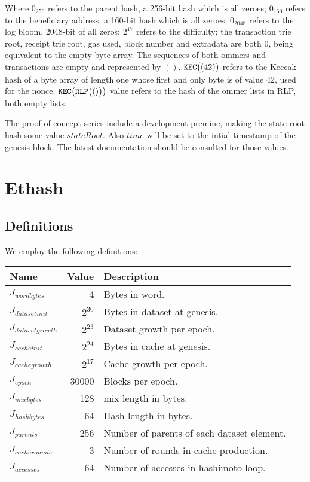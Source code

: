 \documentclass[9pt,oneside]{amsart}
\begin{document}
Where $0_{256}$ refers to the parent hash, a 256-bit hash which is all zeroes; $0_{160}$ refers to the beneficiary address, a 160-bit hash which is all zeroes; $0_{2048}$ refers to the log bloom, 2048-bit of all zeros; $2^{17}$ refers to the difficulty; the transaction trie root, receipt trie root, gas used, block number and extradata are both $0$, being equivalent to the empty byte array. The sequences of both ommers and transactions are empty and represented by $()$. $\mathtt{\tiny KEC}\big( (42) \big)$ refers to the Keccak hash of a byte array of length one whose first and only byte is of value 42, used for the nonce. $\mathtt{\tiny KEC}\big(\mathtt{\tiny RLP}\big( () \big)\big)$ value refers to the hash of the ommer lists in RLP, both empty lists.

The proof-of-concept series include a development premine, making the state root hash some value $stateRoot$. Also $time$ will be set to the intial timestamp of the genesis block. The latest documentation should be consulted for those values.

\section{Ethash}\label{app:ethash}
\subsection{Definitions}
We employ the following definitions:

\begin{tabular*}{\columnwidth}[h]{lrl}
\toprule
Name & Value & Description \\
\midrule
$J_{wordbytes}$ & 4  & Bytes in word. \\
$J_{datasetinit}$ & $2^{30}$ & Bytes in dataset at genesis. \\
$J_{datasetgrowth}$ & $2^{23}$ & Dataset growth per epoch. \\
$J_{cacheinit}$ & $2^{24}$ & Bytes in cache at genesis. \\
$J_{cachegrowth}$ & $2^{17}$ & Cache growth per epoch. \\
$J_{epoch}$ & 30000 & Blocks per epoch. \\
$J_{mixbytes}$ & 128 & mix length in bytes. \\
$J_{hashbytes}$ & 64 & Hash length in bytes. \\
$J_{parents}$ & 256 & Number of parents of each dataset element. \\
$J_{cacherounds}$ & 3 & Number of rounds in cache production. \\
$J_{accesses}$ & 64 & Number of accesses in hashimoto loop. \\
\bottomrule
\end{tabular*}
\end{document}
